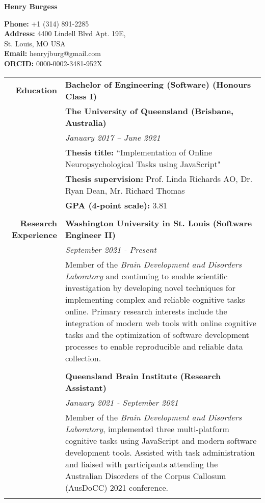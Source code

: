 \documentclass{article}
\begin{document}
	\begin{minipage}{2.5in}
		\huge\textbf{Henry Burgess} 
	\end{minipage}
	\hfill
	\begin{minipage}{3in}
		\textbf{Phone:}  +1 (314) 891-2285 \\
		\hfill \textbf{Address:} 4400 Lindell Blvd Apt. 19E, \\
		St. Louis, MO USA \\
		\textbf{Email:} henryjburg@gmail.com \\
		\textbf{ORCID:} 0000-0002-3481-952X
	\end{minipage}
	\begin{longtable}{r | p{13cm}} 	
		\large\textbf{Education} 		  	& \large\textbf{Bachelor of Engineering (Software) (Honours Class I)} \\
											& \textbf{The University of Queensland (Brisbane, Australia)} \\
											& \textit{January 2017 – June 2021} \\
											& \textbf{Thesis title:} ``Implementation of Online Neuropsychological Tasks using JavaScript" \\
											& \textbf{Thesis supervision:} Prof. Linda Richards AO, Dr. Ryan Dean, Mr. Richard Thomas \\
											& \textbf{GPA (4-point scale):} 3.81 \\
											& \\

		\large\textbf{Research Experience}  & \large\textbf{Washington University in St. Louis (Software Engineer II)} \\
											& \textit{September 2021 - Present} \\
											& Member of the \textit{Brain Development and Disorders Laboratory} and continuing to enable scientific investigation by developing novel techniques for implementing complex and reliable cognitive tasks online. Primary research interests include the integration of modern web tools with online cognitive tasks and the optimization of software development processes to enable reproducible and reliable data collection. \\ 
											& \\

											& \large\textbf{Queensland Brain Institute (Research Assistant)} \\
											& \textit{January 2021 - September 2021} \\
											& Member of the \textit{Brain Development and Disorders Laboratory}, implemented three multi-platform cognitive tasks using JavaScript and modern software development tools. Assisted with task administration and liaised with participants attending the Australian Disorders of the Corpus Callosum (AusDoCC) 2021 conference. \\ 
											& \\


\end{longtable}
\end{document}

